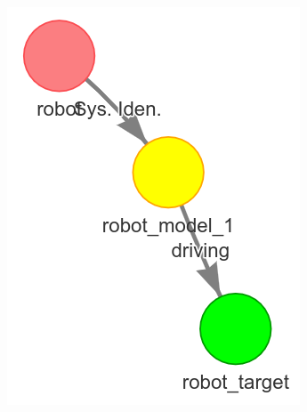 \begin{figure}[H]
    \centering
    \begin{subfigure}{.3\textwidth}
    \centering
    \includegraphics[width=\textwidth]{figures/proposed_method/connecting_nodes/failure/fail_2}
    \end{subfigure}
    \begin{subfigure}{.3\textwidth}
    \centering

\end{subfigure}
\end{figure}
